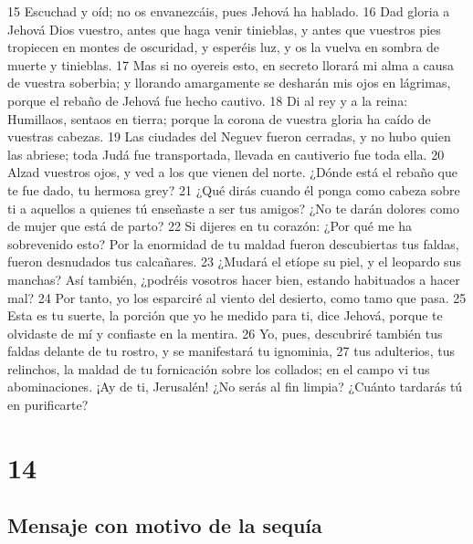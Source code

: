 15 Escuchad y oíd; no os envanezcáis, pues Jehová ha hablado.
16 Dad gloria a Jehová Dios vuestro, antes que haga venir tinieblas, y antes que vuestros pies tropiecen en montes de oscuridad, y esperéis luz, y os la vuelva en sombra de muerte y tinieblas.
17 Mas si no oyereis esto, en secreto llorará mi alma a causa de vuestra soberbia; y llorando amargamente se desharán mis ojos en lágrimas, porque el rebaño de Jehová fue hecho cautivo.
18 Di al rey y a la reina: Humillaos, sentaos en tierra; porque la corona de vuestra gloria ha caído de vuestras cabezas.
19 Las ciudades del Neguev fueron cerradas, y no hubo quien las abriese; toda Judá fue transportada, llevada en cautiverio fue toda ella.
20 Alzad vuestros ojos, y ved a los que vienen del norte. ¿Dónde está el rebaño que te fue dado, tu hermosa grey?
21 ¿Qué dirás cuando él ponga como cabeza sobre ti a aquellos a quienes tú enseñaste a ser tus amigos? ¿No te darán dolores como de mujer que está de parto?
22 Si dijeres en tu corazón: ¿Por qué me ha sobrevenido esto? Por la enormidad de tu maldad fueron descubiertas tus faldas, fueron desnudados tus calcañares.
23 ¿Mudará el etíope su piel, y el leopardo sus manchas? Así también, ¿podréis vosotros hacer bien, estando habituados a hacer mal?
24 Por tanto, yo los esparciré al viento del desierto, como tamo que pasa.
25 Esta es tu suerte, la porción que yo he medido para ti, dice Jehová, porque te olvidaste de mí y confiaste en la mentira.
26 Yo, pues, descubriré también tus faldas delante de tu rostro, y se manifestará tu ignominia,
27 tus adulterios, tus relinchos, la maldad de tu fornicación sobre los collados; en el campo vi tus abominaciones. ¡Ay de ti, Jerusalén! ¿No serás al fin limpia? ¿Cuánto tardarás tú en purificarte?

\chapter{14}

\section*{Mensaje con motivo de la sequía}

